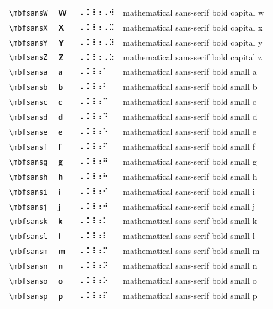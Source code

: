 \documentclass[oneside]{article}
\begin{document}
\begin{longtable}{llll}
\verb|\mbfsansW| & $\mbfsansW$ &  ⠠⠨⠸⠰⠠⠺  & {mathematical sans-serif bold capital w} \\[2ex]
\verb|\mbfsansX| & $\mbfsansX$ &  ⠠⠨⠸⠰⠠⠭  & {mathematical sans-serif bold capital x} \\[2ex]
\verb|\mbfsansY| & $\mbfsansY$ &  ⠠⠨⠸⠰⠠⠽  & {mathematical sans-serif bold capital y} \\[2ex]
\verb|\mbfsansZ| & $\mbfsansZ$ &  ⠠⠨⠸⠰⠠⠵  & {mathematical sans-serif bold capital z} \\[2ex]
\verb|\mbfsansa| & $\mbfsansa$ &  ⠠⠨⠸⠰⠁  & {mathematical sans-serif bold small a} \\[2ex]
\verb|\mbfsansb| & $\mbfsansb$ &  ⠠⠨⠸⠰⠃  & {mathematical sans-serif bold small b} \\[2ex]
\verb|\mbfsansc| & $\mbfsansc$ &  ⠠⠨⠸⠰⠉  & {mathematical sans-serif bold small c} \\[2ex]
\verb|\mbfsansd| & $\mbfsansd$ &  ⠠⠨⠸⠰⠙  & {mathematical sans-serif bold small d} \\[2ex]
\verb|\mbfsanse| & $\mbfsanse$ &  ⠠⠨⠸⠰⠑  & {mathematical sans-serif bold small e} \\[2ex]
\verb|\mbfsansf| & $\mbfsansf$ &  ⠠⠨⠸⠰⠋  & {mathematical sans-serif bold small f} \\[2ex]
\verb|\mbfsansg| & $\mbfsansg$ &  ⠠⠨⠸⠰⠛  & {mathematical sans-serif bold small g} \\[2ex]
\verb|\mbfsansh| & $\mbfsansh$ &  ⠠⠨⠸⠰⠓  & {mathematical sans-serif bold small h} \\[2ex]
\verb|\mbfsansi| & $\mbfsansi$ &  ⠠⠨⠸⠰⠊  & {mathematical sans-serif bold small i} \\[2ex]
\verb|\mbfsansj| & $\mbfsansj$ &  ⠠⠨⠸⠰⠚  & {mathematical sans-serif bold small j} \\[2ex]
\verb|\mbfsansk| & $\mbfsansk$ &  ⠠⠨⠸⠰⠅  & {mathematical sans-serif bold small k} \\[2ex]
\verb|\mbfsansl| & $\mbfsansl$ &  ⠠⠨⠸⠰⠇  & {mathematical sans-serif bold small l} \\[2ex]
\verb|\mbfsansm| & $\mbfsansm$ &  ⠠⠨⠸⠰⠍  & {mathematical sans-serif bold small m} \\[2ex]
\verb|\mbfsansn| & $\mbfsansn$ &  ⠠⠨⠸⠰⠝  & {mathematical sans-serif bold small n} \\[2ex]
\verb|\mbfsanso| & $\mbfsanso$ &  ⠠⠨⠸⠰⠕  & {mathematical sans-serif bold small o} \\[2ex]
\verb|\mbfsansp| & $\mbfsansp$ &  ⠠⠨⠸⠰⠏  & {mathematical sans-serif bold small p} \\[2ex]

\end{longtable}
\end{document}
